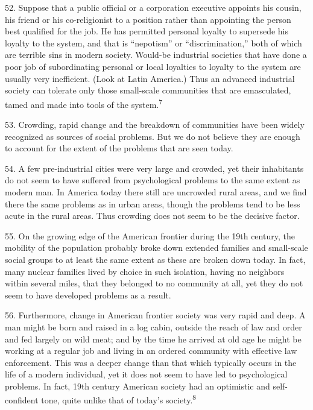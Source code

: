 \documentclass{article}
\begin{document}
52.  Suppose that a public official or a corporation executive appoints his cousin, his friend or his 
co-religionist  to  a  position  rather  than  appointing  the  person  best  qualified  for  the  job.   He  has  
permitted  personal  loyalty  to  supersede  his  loyalty  to  the  system,  and  that  is  “nepotism”  or  
“discrimination,” both of which are terrible sins in modern society.  Would-be industrial societies 
that have done a poor job of subordinating personal or local loyalties to loyalty to the system are 
usually very inefficient.  (Look at Latin America.) Thus an advanced industrial society can tolerate 
only  those  small-scale  communities  that  are  emasculated,  tamed  and  made  into  tools  of  the  
system.\textsuperscript{7} \vspace{\baselineskip}

53.  Crowding, rapid change and the breakdown of communities have been widely recognized as 
sources of social problems.  But we do not believe they are enough to account for the extent of the 
problems that are seen today. \vspace{\baselineskip} \newpage

54.  A few pre-industrial cities were very large and crowded, yet their inhabitants do not seem to 
have suffered from psychological problems to the same extent as modern man.  In America today 
there still are uncrowded rural areas, and we find there the same problems as in urban areas, though 
the  problems  tend  to  be  less  acute  in  the  rural  areas.   Thus  crowding  does  not  seem  to  be  the  
decisive factor. \vspace{\baselineskip}

55.  On  the  growing  edge  of  the  American  frontier  during  the  19th  century,  the  mobility  of  the  
population  probably  broke  down  extended  families  and  small-scale  social  groups  to  at  least  the  
same  extent  as  these  are  broken  down  today.   In  fact,  many  nuclear  families  lived  by  choice  in  
such isolation, having no neighbors within several miles, that they belonged to no community at 
all, yet they do not seem to have developed problems as a result. \vspace{\baselineskip}

56.  Furthermore, change in American frontier society was very rapid and deep.  A man might be 
born and raised in a log cabin, outside the reach of law and order and fed largely on wild meat; 
and by the time he arrived at old age he might be working at a regular job and living in an ordered 
community with effective law enforcement.  This was a deeper change than that which typically 
occurs  in  the  life  of  a  modern  individual,  yet  it  does  not  seem  to  have  led  to  psychological  
problems.  In fact, 19th century American society had an optimistic and self-confident tone, quite 
unlike that of today’s society.\textsuperscript{8} \vspace{\baselineskip}
\end{document}
